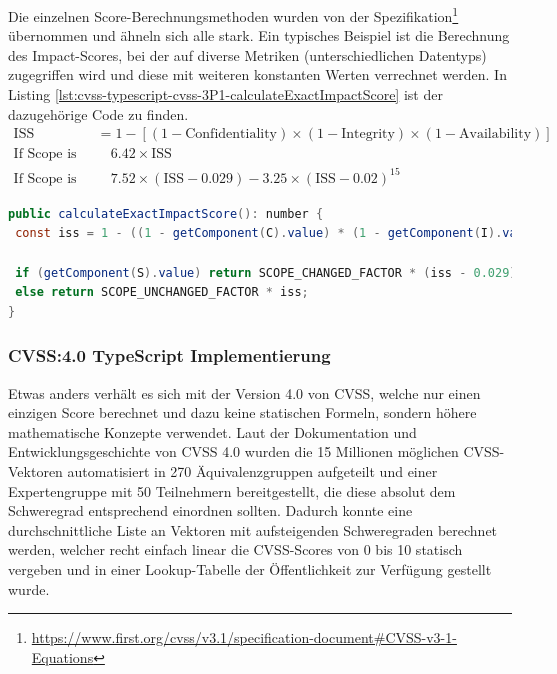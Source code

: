 Die einzelnen Score-Berechnungsmethoden wurden von der Spezifikation\footnote{\url{https://www.first.org/cvss/v3.1/specification-document\#CVSS-v3-1-Equations}} übernommen und ähneln sich alle stark.
Ein typisches Beispiel ist die Berechnung des Impact-Scores, bei der auf diverse Metriken (unterschiedlichen Datentyps) zugegriffen wird und diese mit weiteren konstanten Werten verrechnet werden.
In Listing \ref{lst:cvss-typescript-cvss-3P1-calculateExactImpactScore} ist der dazugehörige Code zu finden.
\begin{align*}
    \text{ISS} &= 1 - [ (1 - \text{Confidentiality}) \times (1 - \text{Integrity}) \times (1 - \text{Availability}) ] \\
    \text{If Scope is Unchanged:} & \quad 6.42 \times \text{ISS} \\
    \text{If Scope is Changed:} & \quad 7.52 \times (\text{ISS} - 0.029) - 3.25 \times (\text{ISS} - 0.02)^{15}
\end{align*}

\begin{lstlisting}[language=Java, label={lst:cvss-typescript-cvss-3P1-calculateExactImpactScore}, caption={CVSS 3.1 Impact Score-Berechnung in TypeScript}]
public calculateExactImpactScore(): number {
 const iss = 1 - ((1 - getComponent(C).value) * (1 - getComponent(I).value) * (1 - getComponent(A).value));

 if (getComponent(S).value) return SCOPE_CHANGED_FACTOR * (iss - 0.029) - 3.25 * Math.pow(iss - 0.02, 15);
 else return SCOPE_UNCHANGED_FACTOR * iss;
}
\end{lstlisting}

\subsubsection{CVSS:4.0 TypeScript Implementierung} \label{subsec:projektbericht-loesungsweg-typescript-cvss-online-calculator-cvss-4P0}

Etwas anders verhält es sich mit der Version 4.0 von CVSS, welche nur einen einzigen Score berechnet und dazu keine statischen Formeln, sondern höhere mathematische Konzepte verwendet.
Laut der Dokumentation und Entwicklungsgeschichte von CVSS 4.0 \cite{CVSSv4.0Specification} wurden die 15 Millionen möglichen CVSS-Vektoren automatisiert in 270 Äquivalenzgruppen aufgeteilt und einer Expertengruppe mit 50 Teilnehmern bereitgestellt, die diese absolut dem Schweregrad entsprechend einordnen sollten.
Dadurch konnte eine durchschnittliche Liste an Vektoren mit aufsteigenden Schweregraden berechnet werden, welcher recht einfach linear die CVSS-Scores von 0 bis 10 statisch vergeben und in einer Lookup-Tabelle der Öffentlichkeit zur Verfügung gestellt wurde.


